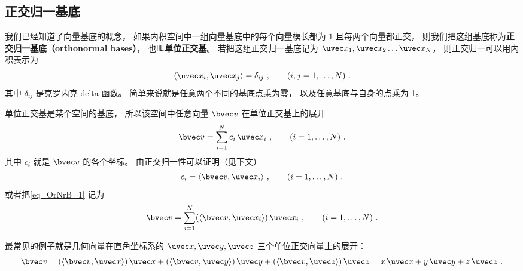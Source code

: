
\begin{issues}
\issueTODO
\end{issues}



\subsection{正交归一基底}

我们已经知道了向量基底的概念， 如果内积空间中一组向量基底中的每个向量模长都为 $1$ 且每两个向量都正交， 则我们把这组基底称为\textbf{正交归一基底（orthonormal bases）}， 也叫\textbf{单位正交基}。 若把这组正交归一基底记为 $\uvec x_1,\uvec x_2\dots\uvec x_N$， 则正交归一可以用内积表示为
\begin{equation}\label{eq_OrNrB_3}
\langle \uvec x_i, \uvec x_j \rangle = \delta_{ij} ~,\qquad (i,j = 1,\dots, N)~.
\end{equation}
其中 $\delta_{ij}$ 是克罗内克 delta 函数。 简单来说就是任意两个不同的基底点乘为零， 以及任意基底与自身的点乘为 1。

单位正交基是某个空间的基底， 所以该空间中任意向量 $\bvec v$ 在单位正交基上的展开
\begin{equation}\label{eq_OrNrB_1}
\bvec v = \sum_{i = 1}^N c_i \,\uvec x_i ~,\qquad (i = 1,\dots, N)~.
\end{equation}
其中 $c_i$ 就是 $\bvec v$ 的各个坐标。 由正交归一性可以证明（见下文）
\begin{equation}\label{eq_OrNrB_4}
c_i = \langle \bvec v, \uvec x_i \rangle ~,\qquad (i = 1,\dots, N)~.
\end{equation}
或者把\autoref{eq_OrNrB_1} 记为
\begin{equation}\label{eq_OrNrB_5}
\bvec v = \sum_{i = 1}^N (\langle \bvec v, \uvec x_i \rangle) \,\uvec x_i~, \qquad (i = 1,\dots, N)~.
\end{equation}

最常见的例子就是几何向量在直角坐标系的 $\uvec x, \uvec y, \uvec z$ 三个单位正交向量上的展开：
\begin{equation}
\bvec v = (\langle \bvec v, \uvec x \rangle)\,\uvec x + (\langle \bvec v, \uvec y \rangle)\,\uvec y + (\langle \bvec v, \uvec z \rangle)\,\uvec z = x \,\uvec x + y \,\uvec y + z \,\uvec z~.
\end{equation} 

